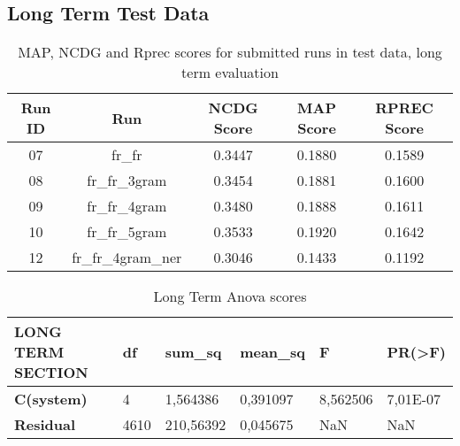 \subsection{Long Term Test Data}\label{subsec:long_term}
\begin{table}[h!]
    \begin{center}
        \caption{MAP, NCDG and Rprec scores for submitted runs in test data, long term evaluation}
        \label{tab:longTerms_scores}
        \begin{tabular}{|c|c||c|c|c|}
            \hline
            \textbf{Run ID} & \textbf{Run} & \textbf{NCDG Score} & \textbf{MAP Score} & \textbf{RPREC Score}\\
            \hline\hline
            07 & fr\_fr & 0.3447 & 0.1880 & 0.1589 \\
            \hline
            08 & fr\_fr\_3gram & 0.3454 & 0.1881 & 0.1600 \\
            \hline
            09 & fr\_fr\_4gram & 0.3480 & 0.1888 & 0.1611 \\
            \hline
            10 & fr\_fr\_5gram & 0.3533 & 0.1920 & 0.1642 \\
            \hline
            12 & fr\_fr\_4gram\_ner & 0.3046 & 0.1433 & 0.1192\\
            \hline
        \end{tabular}
    \end{center}
\end{table}
\begin{table}[!ht]
    \centering
    \caption{Long Term Anova scores}
    \begin{tabular}{|l|l|l|l|l|l|}
    \hline
        \textbf{LONG TERM SECTION} & \textbf{df} & \textbf{sum\_sq} & \textbf{mean\_sq} & \textbf{F} & \textbf{PR(>F)} \\ \hline\hline
        \textbf{C(system)} & 4 & 1,564386 & 0,391097 & 8,562506 & 7,01E-07 \\ \hline
        \textbf{Residual} & 4610 & 210,56392 & 0,045675 & NaN & NaN \\ \hline
    \end{tabular}
    \label{LT_Anova}
\end{table}

